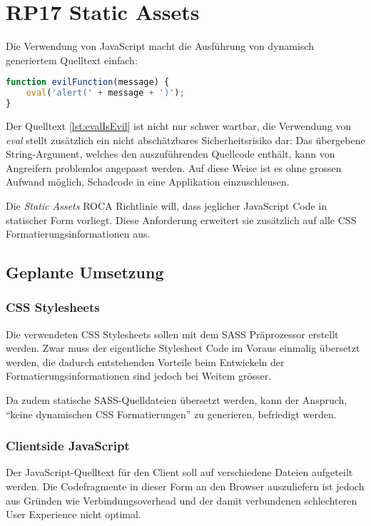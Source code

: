 \section{RP17 Static Assets}
\label{sec:principle-rp17-static-assets}

Die Verwendung von JavaScript macht die Ausführung von dynamisch generiertem Quelltext einfach:

\begin{lstlisting}[language=JavaScript, caption={Ausführung von dynamischem Quelltext mittels \emph{eval}}, label={lst:evalIsEvil}]
function evilFunction(message) {
	eval('alert(' + message + ')');
}
\end{lstlisting}

Der Quelltext \ref{lst:evalIsEvil} ist nicht nur schwer wartbar, die Verwendung von \emph{eval} \cite{mdnEval} stellt zusätzlich ein nicht abschätzbares Sicherheitsrisiko dar: Das übergebene String-Argument, welches den auszuführenden Quellcode enthält, kann von Angreifern problemlos angepasst werden. Auf diese Weise ist es ohne grossen Aufwand möglich, Schadcode in eine Applikation einzuschleusen.

Die \emph{Static Assets} ROCA Richtlinie will, dass jeglicher JavaScript Code in statischer Form vorliegt. Diese Anforderung erweitert sie zusätzlich auf alle CSS Formatierungsinformationen aus.

\subsection*{Geplante Umsetzung}
\subsubsection*{CSS Stylesheets}
Die verwendeten CSS Stylesheets sollen mit dem SASS Präprozessor \cite{SASS} erstellt werden. Zwar muss der eigentliche Stylesheet Code im Voraus einmalig übersetzt werden, die dadurch entstehenden Vorteile beim Entwickeln der Formatierungsinformationen sind jedoch bei Weitem grösser.

Da zudem statische SASS-Quelldateien übersetzt werden, kann der Anspruch, ``keine dynamischen CSS Formatierungen'' zu generieren, befriedigt werden.

\subsubsection*{Clientside JavaScript}
Der JavaScript-Quelltext für den Client soll auf verschiedene Dateien aufgeteilt werden. Die Codefragmente in dieser Form an den Browser auszuliefern ist jedoch aus Gründen wie Verbindungsoverhead und der damit verbundenen schlechteren User Experience nicht optimal.

